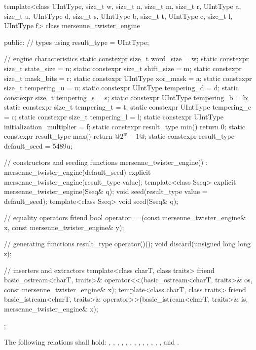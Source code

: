 %
%
\begin{codeblock}
template<class UIntType, size_t w, size_t n, size_t m, size_t r,
         UIntType a, size_t u, UIntType d, size_t s,
         UIntType b, size_t t,
         UIntType c, size_t l, UIntType f>
  class mersenne_twister_engine {
  public:
    // types
    using result_type = UIntType;

    // engine characteristics
    static constexpr size_t word_size = w;
    static constexpr size_t state_size = n;
    static constexpr size_t shift_size = m;
    static constexpr size_t mask_bits = r;
    static constexpr UIntType xor_mask = a;
    static constexpr size_t tempering_u = u;
    static constexpr UIntType tempering_d = d;
    static constexpr size_t tempering_s = s;
    static constexpr UIntType tempering_b = b;
    static constexpr size_t tempering_t = t;
    static constexpr UIntType tempering_c = c;
    static constexpr size_t tempering_l = l;
    static constexpr UIntType initialization_multiplier = f;
    static constexpr result_type min() { return 0; }
    static constexpr result_type max() { return  @$2^w - 1$@; }
    static constexpr result_type default_seed = 5489u;

    // constructors and seeding functions
    mersenne_twister_engine() : mersenne_twister_engine(default_seed) {}
    explicit mersenne_twister_engine(result_type value);
    template<class Sseq> explicit mersenne_twister_engine(Sseq& q);
    void seed(result_type value = default_seed);
    template<class Sseq> void seed(Sseq& q);

    // equality operators
    friend bool operator==(const mersenne_twister_engine& x, const mersenne_twister_engine& y);

    // generating functions
    result_type operator()();
    void discard(unsigned long long z);

    // inserters and extractors
    template<class charT, class traits>
      friend basic_ostream<charT, traits>&
        operator<<(basic_ostream<charT, traits>& os, const mersenne_twister_engine& x);
    template<class charT, class traits>
      friend basic_istream<charT, traits>&
        operator>>(basic_istream<charT, traits>& is, mersenne_twister_engine& x);
  };
\end{codeblock}

\pnum
The following relations shall hold:
  ,
  ,
  ,
  ,
  ,
  ,
  ,
  ,
  ,
  ,
  ,
  ,
  ,
and
  .

